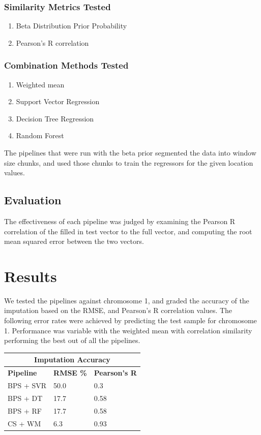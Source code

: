 \documentclass{article} %
\begin{document}
\subsubsection{Similarity Metrics Tested}
\begin{enumerate}
	\item Beta Distribution Prior Probability
	\item Pearson's R correlation
\end{enumerate}

\subsubsection{Combination Methods Tested}
\begin{enumerate}
	\item Weighted mean
	\item Support Vector Regression
	\item Decision Tree Regression
	\item Random Forest
\end{enumerate}

The pipelines that were run with the beta prior segmented the data into window size chunks, and used those chunks to train the regressors for the given location values.

\subsection{Evaluation}
The effectiveness of each pipeline was judged by examining the Pearson R correlation of the filled in test vector to the full vector, and computing the root mean squared error between the two vectors.

\section{Results}
We tested the pipelines against chromosome 1, and graded the accuracy of the imputation based on the RMSE, and Pearson's R correlation values. The following error rates were achieved by predicting the test sample for chromosome 1. Performance was variable with the weighted mean with correlation similarity performing the best out of all the pipelines.
\begin{center}
	\begin{tabular}{ |p{2cm}|p{2.3cm}|p{2.3cm}|}
		\hline
		\multicolumn{3}{|c|}{\textbf{Imputation Accuracy}} \\
		\hline
		\textbf{Pipeline} & \textbf{RMSE \%} & \textbf{Pearson's R} \\
		\hline
		BPS + SVR & 50.0 & 0.3 \\
		BPS + DT & 17.7  & 0.58 \\
		BPS + RF & 17.7 & 0.58 \\
		CS + WM & 6.3 & 0.93 \\
		\hline
	\end{tabular}
\end{center}
\end{document}
